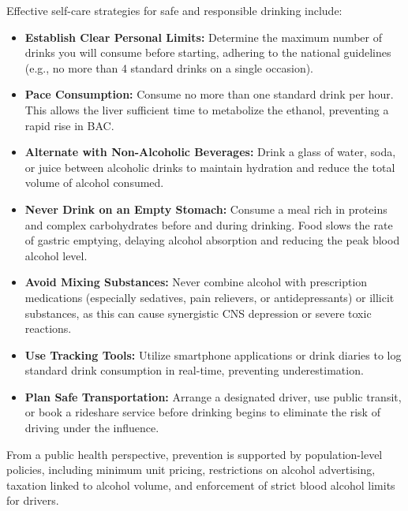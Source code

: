 Effective self-care strategies for safe and responsible drinking include:
\begin{itemize}
    \item \textbf{Establish Clear Personal Limits:} Determine the maximum number of drinks you will consume before starting, adhering to the national guidelines (e.g., no more than 4 standard drinks on a single occasion).
    \item \textbf{Pace Consumption:} Consume no more than one standard drink per hour. This allows the liver sufficient time to metabolize the ethanol, preventing a rapid rise in BAC.
    \item \textbf{Alternate with Non-Alcoholic Beverages:} Drink a glass of water, soda, or juice between alcoholic drinks to maintain hydration and reduce the total volume of alcohol consumed.
    \item \textbf{Never Drink on an Empty Stomach:} Consume a meal rich in proteins and complex carbohydrates before and during drinking. Food slows the rate of gastric emptying, delaying alcohol absorption and reducing the peak blood alcohol level.
    \item \textbf{Avoid Mixing Substances:} Never combine alcohol with prescription medications (especially sedatives, pain relievers, or antidepressants) or illicit substances, as this can cause synergistic CNS depression or severe toxic reactions.
    \item \textbf{Use Tracking Tools:} Utilize smartphone applications or drink diaries to log standard drink consumption in real-time, preventing underestimation.
    \item \textbf{Plan Safe Transportation:} Arrange a designated driver, use public transit, or book a rideshare service before drinking begins to eliminate the risk of driving under the influence.
\end{itemize}

From a public health perspective, prevention is supported by population-level policies, including minimum unit pricing, restrictions on alcohol advertising, taxation linked to alcohol volume, and enforcement of strict blood alcohol limits for drivers.

